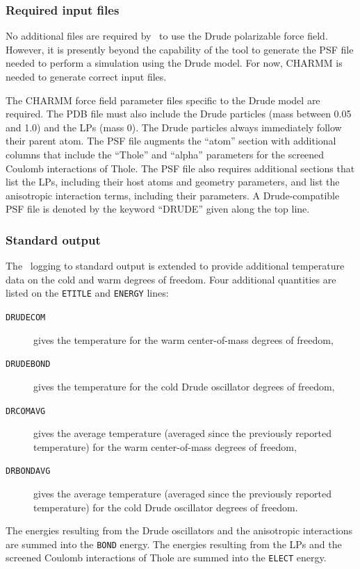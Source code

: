 \subsubsection{Required input files}

No additional files are required by \NAMD\ to use the Drude polarizable force
  field.
However, it is presently beyond the capability of the \PSFGEN{} tool to
  generate the PSF file needed to perform a simulation using the Drude model.
For now, CHARMM is needed to generate correct input files.

The CHARMM force field parameter files specific to the Drude model are
  required.
The PDB file must also include the Drude particles (mass between 0.05 and 1.0)
  and the LPs (mass 0).
The Drude particles always immediately follow their parent atom.
The PSF file augments the ``atom'' section with additional columns that include
  the ``Thole'' and ``alpha'' parameters for the screened Coulomb interactions
  of Thole.
The PSF file also requires additional sections that list the LPs, including
  their host atoms and geometry parameters, and list the anisotropic
  interaction terms, including their parameters.
A Drude-compatible PSF file is denoted by the keyword ``DRUDE'' given along the
  top line.

\subsubsection{Standard output}

The \NAMD\ logging to standard output is extended to provide additional
  temperature data on the cold and warm degrees of freedom.
Four additional quantities are listed on the {\tt ETITLE} and {\tt ENERGY}
  lines:
\begin{description}
\item[{\tt DRUDECOM}] gives the temperature for the warm center-of-mass
  degrees of freedom,
\item[{\tt DRUDEBOND}] gives the temperature for the cold Drude oscillator
  degrees of freedom,
\item[{\tt DRCOMAVG}] gives the average temperature (averaged since the
  previously reported temperature) for the warm center-of-mass degrees of
  freedom,
\item[{\tt DRBONDAVG}] gives the average temperature (averaged since the
  previously reported temperature) for the cold Drude oscillator degrees of
  freedom.
\end{description}
The energies resulting from the Drude oscillators and the anisotropic
  interactions are summed into the {\tt BOND} energy.
The energies resulting from the LPs and the screened Coulomb interactions of
  Thole are summed into the {\tt ELECT} energy.

